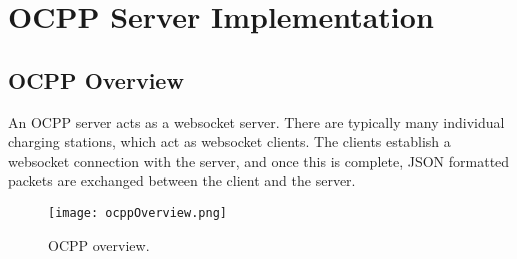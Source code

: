 \documentclass[12pt,openany,a4paper]{book}
\begin{document}
%
 











\chapter{OCPP Server Implementation}
\section{OCPP Overview}
An OCPP server acts as a websocket server. There are typically many individual charging stations, which act as websocket clients. The clients establish a websocket connection with the server, and once this is complete, JSON formatted packets are exchanged between the client and the server.
\begin{center}
\begin{figure}[htbp]
\texttt{[image: ocppOverview.png]}
\caption{OCPP overview.}
\end{figure}

\end{center}
\end{document}
